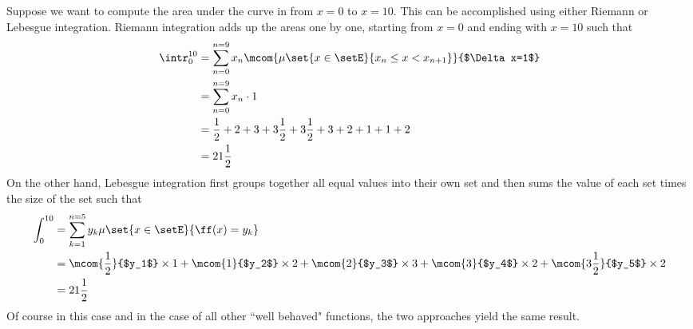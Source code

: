 \begin{example}
\label{ex:int_curve}
Suppose we want to compute the area under the curve in 
from $x=0$ to $x=10$.
This can be accomplished using either Riemann or Lebesgue integration. 
Riemann integration adds up the areas one by one, starting from $x=0$ and ending 
with $x=10$ such that
\begin{align*}
  \intr_0^{10} 
    &= \sum_{n=0}^{n=9} x_n \mcom{\mu\set{x\in\setE}{x_n\le x<x_{n+1}}}{$\Delta x=1$}
  \\&= \sum_{n=0}^{n=9} x_n \cdot 1
  \\&= \frac{1}{2} + 2 + 3 + 3\frac{1}{2} + 3\frac{1}{2} + 3 + 2 + 1 + 1 + 2
  \\&= 21\frac{1}{2}
\end{align*}
On the other hand, Lebesgue integration first groups together all equal values
into their own set and then sums the value of each set times the size of the set such that
\begin{align*}
  \int_0^{10} 
    &= \sum_{k=1}^{n=5} y_k \mu\set{x\in\setE}{\ff(x)=y_k}
  \\&= \mcom{\frac{1}{2}}{$y_1$}  \times 1 + 
       \mcom{1}{$y_2$}            \times 2 +   
       \mcom{2}{$y_3$}            \times 3 + 
       \mcom{3}{$y_4$}            \times 2 + 
       \mcom{3\frac{1}{2}}{$y_5$} \times 2
  \\&= 21\frac{1}{2}
\end{align*}
Of course in this case and in the case of all other ``well behaved" functions, 
the two approaches yield the same result.
\end{example}


